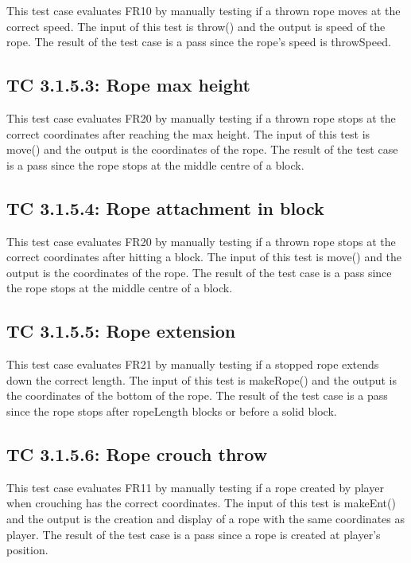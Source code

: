 \documentclass[12pt, titlepage]{article}
\begin{document}
This test case evaluates FR10 by manually testing if a thrown rope moves at the correct speed. The input of this test is throw() and the output is speed of the rope. The result of the test case is a pass since the rope's speed is throwSpeed. 

\subsection*{TC 3.1.5.3: Rope max height}

This test case evaluates FR20 by manually testing if a thrown rope stops at the correct coordinates after reaching the max height. The input of this test is move() and the output is the coordinates of the rope. The result of the test case is a pass since the rope stops at the middle centre of a block.

\subsection*{TC 3.1.5.4: Rope attachment in block}

This test case evaluates FR20 by manually testing if a thrown rope stops at the correct coordinates after hitting a block. The input of this test is move() and the output is the coordinates of the rope. The result of the test case is a pass since the rope stops at the middle centre of a block.

\subsection*{TC 3.1.5.5: Rope extension}

This test case evaluates FR21 by manually testing if a stopped rope extends down the correct length. The input of this test is makeRope() and the output is the coordinates of the bottom of the rope. The result of the test case is a pass since the rope stops after ropeLength blocks or before a solid block.  

\subsection*{TC 3.1.5.6: Rope crouch throw}

This test case evaluates FR11 by manually testing if a rope created by player when crouching has the correct coordinates. The input of this test is makeEnt() and the output is the creation and display of a rope with the same coordinates as player. The result of the test case is a pass since a rope is created at player's position. 
\end{document}
